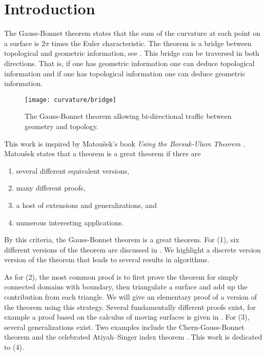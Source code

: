 \section{Introduction}
\label{sec:intro}


The Gauss-Bonnet theorem states that the sum of the curvature
at each point on a surface is $2\pi$ times the Euler characteristic.
The theorem is a bridge between topological
and geometric information, see . 
This bridge can be traversed in both directions.
That is, if one has geometric information one can deduce topological information and
if one has topological information one can deduce geometric information.


\begin{figure}[htb]
\centering
\texttt{[image: curvature/bridge]}
\caption{The Gauss-Bonnet theorem allowing bi-directional traffic
between geometry and topology.}
\label{fig:bridge}
\end{figure}

This work is inspired by Matou\v{s}ek's book \emph{Using the Borsuk-Ulam Theorem}
\cite{jm08}.
Matou\v{s}ek states that a theorem is a great theorem if there are
\begin{enumerate}[(1)]
\item several different equivalent versions,
\item many different proofs,
\item a host of extensions and generalizations, and
\item numerous interesting applications.
\end{enumerate}

By this criteria, the Gauss-Bonnet theorem is a great theorem.
For (1), six different versions of the theorem are discussed
in \cite{wu_historical_2008}. 
We highlight a discrete version version of the theorem that leads to several
results in algorithms.

As for (2), the most common proof is to first prove the theorem for simply connected domains
with boundary, then triangulate a surface and add up the contribution from each triangle.
We will give an elementary proof of a version of the theorem using this strategy.
Several fundamentally different proofs exist, for example 
a proof based on the calculus of
moving surfaces is given in \cite{grinfeld_introduction_2013}.
For (3), several generalizations exist. Two examples include
the Chern-Gauss-Bonnet theorem \cite{chern_simple_1944} and the celebrated Atiyah–Singer index 
theorem \cite{atiyah_index_1963}.
This work is dedicated to (4).

